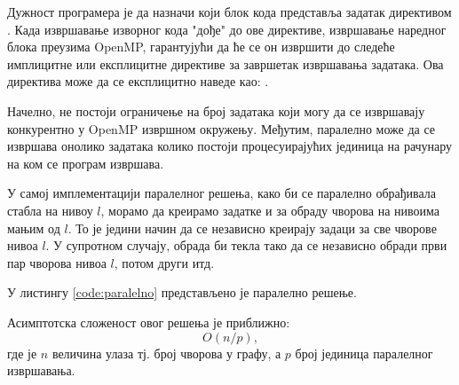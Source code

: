 Дужност програмера је да назначи који блок кода представља задатак директивом\\.
Када извршавање изворног кода "дође" до ове директиве, извршавање наредног блока преузима OpenMP,
гарантујући да ће се он извршити до следеће имплицитне или експлицитне директиве за завршетак извршавања задатака.
Ова директива може да се експлицитно наведе као: .

Начелно, не постоји ограничење на број задатака који могу да се извршавају конкурентно у OpenMP извршном окружењу.
Међутим, паралелно може да се извршава онолико задатака колико постоји процесуирајућих јединица на рачунару на ком
се програм извршава.

У самој имплементацији паралелног решења, како би се паралелно обрађивала стабла на нивоу $l$, морамо да
креирамо задатке и за обраду чворова на нивоима мањим од $l$.
То је једини начин да се независно креирају задаци за све чворове нивоа $l$. У супротном случају,
обрада би текла тако да се независно обради први пар чворова нивоа $l$, потом други итд.

У листингу \ref{code:paralelno} представљено је паралелно решење. 


Асимптотска сложеност овог решења је приближно:
$$O(n/p),$$
где је $n$ величина улаза тј. број чворова у графу, а $p$ број јединица паралелног извршавања.

\pagebreak